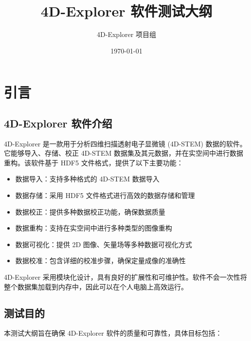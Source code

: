 \documentclass[a4paper,12pt]{report}	%
\title{4D-Explorer 软件测试大纲}
\author{4D-Explorer 项目组}
\date{\today}
\begin{document}
\maketitle
\tableofcontents 

\chapter{引言}

\section{4D-Explorer 软件介绍}

4D-Explorer 是一款用于分析四维扫描透射电子显微镜 (4D-STEM) 数据的软件。它能够导入、存储、校正 4D-STEM 数据集及其元数据，并在实空间中进行数据重构。该软件基于 HDF5 文件格式，提供了以下主要功能：

\begin{itemize}
    \item 数据导入：支持多种格式的 4D-STEM 数据导入
    \item 数据存储：采用 HDF5 文件格式进行高效的数据存储和管理
    \item 数据校正：提供多种数据校正功能，确保数据质量
    \item 数据重构：支持在实空间中进行多种类型的图像重构
    \item 数据可视化：提供 2D 图像、矢量场等多种数据可视化方式
    \item 数据校准：包含详细的校准步骤，确保定量成像的准确性
\end{itemize}

4D-Explorer 采用模块化设计，具有良好的扩展性和可维护性。软件不会一次性将整个数据集加载到内存中，因此可以在个人电脑上高效运行。




\section{测试目的}

本测试大纲旨在确保 4D-Explorer 软件的质量和可靠性，具体目标包括：
\end{document}
